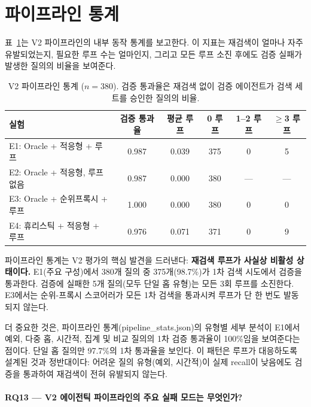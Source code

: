 
\section{파이프라인 통계}
\label{sec:v2_pipeline_stats_ko}

표~\ref{tab:v2_pipeline_stats_ko}는 V2 파이프라인의 내부 동작 통계를 보고한다. 이 지표는 재검색이 얼마나 자주 유발되었는지, 필요한 루프 수는 얼마인지, 그리고 모든 루프 소진 후에도 검증 실패가 발생한 질의의 비율을 보여준다.

\begin{table}[htbp]
\centering
\caption{V2 파이프라인 통계 ($n{=}380$). 검증 통과율은 재검색 없이 검증 에이전트가 검색 세트를 승인한 질의의 비율.}
\label{tab:v2_pipeline_stats_ko}
\begin{tabular}{lccccc}
\toprule
\textbf{실험} & \textbf{검증 통과율} & \textbf{평균 루프} & \textbf{0 루프} & \textbf{1--2 루프} & \textbf{$\geq$3 루프} \\
\midrule
E1: Oracle + 적응형 + 루프      & 0.987 & 0.039 & 375 & 0 & 5 \\
E2: Oracle + 적응형, 루프 없음  & 0.987 & 0.000 & 380 & --- & --- \\
E3: Oracle + 순위프록시 + 루프  & 1.000 & 0.000 & 380 & 0 & 0 \\
E4: 휴리스틱 + 적응형 + 루프   & 0.976 & 0.071 & 371 & 0 & 9 \\
\bottomrule
\end{tabular}
\end{table}

파이프라인 통계는 V2 평가의 핵심 발견을 드러낸다: \textbf{재검색 루프가 사실상 비활성 상태이다.} E1(주요 구성)에서 380개 질의 중 375개(98.7\%)가 1차 검색 시도에서 검증을 통과한다. 검증에 실패한 5개 질의(모두 단일 홉 유형)는 모든 3회 루프를 소진한다. E3에서는 순위-프록시 스코어러가 모든 1차 검색을 통과시켜 루프가 단 한 번도 발동되지 않는다.

더 중요한 것은, 파이프라인 통계(pipeline\_stats.json)의 유형별 세부 분석이 E1에서 예외, 다중 홉, 시간적, 집계 및 비교 질의의 1차 검증 통과율이 100\%임을 보여준다는 점이다. 단일 홉 질의만 97.7\%의 1차 통과율을 보인다. 이 패턴은 루프가 대응하도록 설계된 것과 정반대이다: 어려운 질의 유형(예외, 시간적)이 실제 recall이 낮음에도 검증을 통과하여 재검색이 전혀 유발되지 않는다.

\paragraph{RQ13 --- V2 에이전틱 파이프라인의 주요 실패 모드는 무엇인가?}

